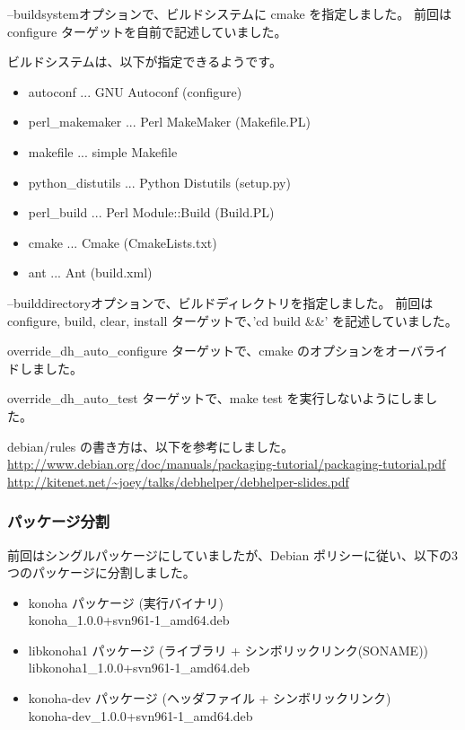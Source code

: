 \documentclass[mingoth,a4paper]{jsarticle}
\begin{document}
--buildsystemオプションで、ビルドシステムに cmake を指定しました。
前回は configure ターゲットを自前で記述していました。

ビルドシステムは、以下が指定できるようです。
\begin{itemize}
\item autoconf ... GNU Autoconf (configure)
\item perl\_makemaker ... Perl MakeMaker (Makefile.PL)
\item makefile ... simple Makefile
\item python\_distutils ... Python Distutils (setup.py)
\item perl\_build ... Perl Module::Build (Build.PL)
\item cmake ... Cmake (CmakeLists.txt)
\item ant ... Ant (build.xml)
\end{itemize}

--builddirectoryオプションで、ビルドディレクトリを指定しました。
前回は configure, build, clear, install ターゲットで、'cd build \&\&' を記述していました。

override\_dh\_auto\_configure ターゲットで、cmake のオプションをオーバライドしました。

override\_dh\_auto\_test ターゲットで、make test を実行しないようにしました。

debian/rules の書き方は、以下を参考にしました。\\
\url{http://www.debian.org/doc/manuals/packaging-tutorial/packaging-tutorial.pdf}\\
\url{http://kitenet.net/~joey/talks/debhelper/debhelper-slides.pdf}

\subsubsection{パッケージ分割}
前回はシングルパッケージにしていましたが、Debian ポリシーに従い、以下の3つのパッケージに分割しました。

\begin{itemize}
\item konoha パッケージ (実行バイナリ)\\
  konoha\_1.0.0+svn961-1\_amd64.deb
\item libkonoha1 パッケージ (ライブラリ + シンボリックリンク(SONAME))\\
  libkonoha1\_1.0.0+svn961-1\_amd64.deb
\item konoha-dev パッケージ (ヘッダファイル + シンボリックリンク)\\
  konoha-dev\_1.0.0+svn961-1\_amd64.deb
\end{itemize}
\end{document}
